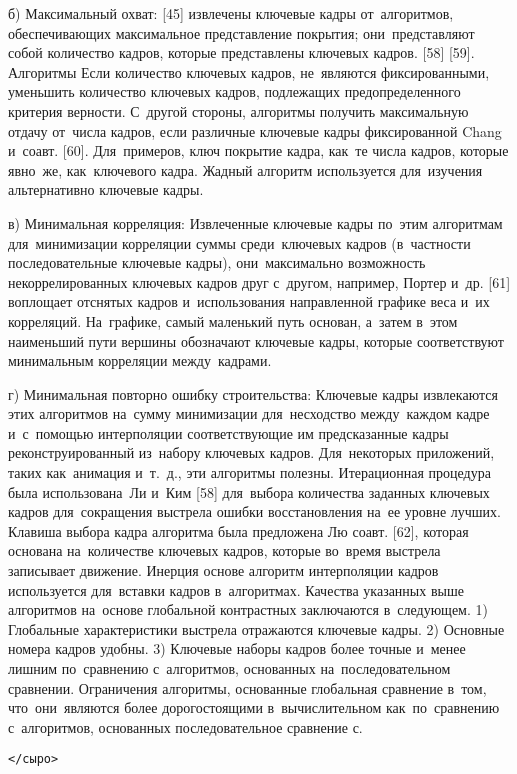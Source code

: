 б) Максимальный охват: [45] извлечены ключевые кадры от~алгоритмов, обеспечивающих максимальное представление покрытия;
они~представляют собой количество кадров, которые представлены ключевых кадров. [58] [59]. Алгоритмы Если количество ключевых кадров, не~являются фиксированными, уменьшить количество ключевых кадров, подлежащих предопределенного критерия верности. С~другой стороны, алгоритмы получить максимальную отдачу от~числа кадров, если различные ключевые кадры фиксированной Chang и~соавт. [60]. Для~примеров, ключ покрытие кадра, как~те числа кадров, которые явно~же, как~ключевого кадра. Жадный алгоритм используется для~изучения альтернативно ключевые кадры.

в) Минимальная корреляция: Извлеченные ключевые кадры по~этим алгоритмам для~минимизации корреляции суммы среди~ключевых кадров (в~частности последовательные ключевые кадры), они~максимально возможность некоррелированных ключевых кадров друг с~другом, например, Портер и~др. [61] воплощает отснятых кадров и~использования направленной графике веса и~их корреляций. На~графике, самый маленький путь основан, а~затем в~этом наименьший пути вершины обозначают ключевые кадры, которые соответствуют минимальным корреляции между~кадрами.

г) Минимальная повторно ошибку строительства: Ключевые кадры извлекаются этих алгоритмов на~сумму минимизации для~несходство между~каждом кадре и~с~помощью интерполяции соответствующие им предсказанные кадры реконструированный из~набору ключевых кадров. Для~некоторых приложений, таких как~анимация и~т.~д., эти алгоритмы полезны.
Итерационная процедура была использована~Ли и~Ким [58] для~выбора количества заданных ключевых кадров для~сокращения выстрела ошибки восстановления на~ее уровне лучших. Клавиша выбора кадра алгоритма была предложена Лю соавт. [62], которая основана на~количестве ключевых кадров, которые во~время выстрела записывает движение.
Инерция основе алгоритм интерполяции кадров используется для~вставки кадров в~алгоритмах. Качества указанных выше алгоритмов на~основе глобальной контрастных заключаются в~следующем.
1) Глобальные характеристики выстрела отражаются ключевые кадры.
2) Основные номера кадров удобны.
3) Ключевые наборы кадров более точные и~менее лишним по~сравнению с~алгоритмов, основанных на~последовательном сравнении. Ограничения алгоритмы, основанные глобальная сравнение в~том, что~они~являются более дорогостоящими в~вычислительном как~по~сравнению с~алгоритмов, основанных последовательное сравнение с.


{\tt </сыро>}





